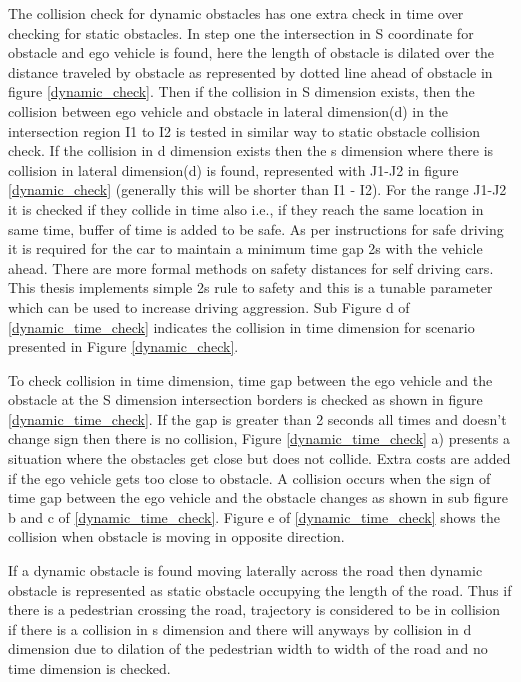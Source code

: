 The collision check for dynamic obstacles has one extra check in time over checking for static obstacles. In step one the intersection in S coordinate for obstacle and ego vehicle is found, here the length of obstacle is dilated over the distance traveled by obstacle as represented by dotted line ahead of obstacle in figure \ref{dynamic_check}. Then if the collision in S dimension exists, then the collision between ego vehicle and obstacle in lateral dimension(d) in the intersection region I1 to I2 is tested in similar way to static obstacle collision check. If the collision in d dimension exists then the s dimension where there is collision in lateral dimension(d) is found, represented with J1-J2 in figure \ref{dynamic_check} (generally this will be shorter than I1 - I2). For the range J1-J2 it is checked if they collide in time also i.e., if they reach the same location in same time, buffer of time is added to be safe. As per instructions for safe driving it is required for the car to maintain a minimum time gap 2s with the vehicle ahead. There are more formal methods \cite{mobile_eye_safety_distance} on safety distances for self driving cars. This thesis implements simple 2s rule to safety and this is a tunable parameter which can be used to increase driving aggression. Sub Figure d of \ref{dynamic_time_check} indicates the collision in time dimension for scenario presented in Figure \ref{dynamic_check}.

To check collision in time dimension, time gap between the ego vehicle and the obstacle at the S dimension intersection borders is checked as shown in figure \ref{dynamic_time_check}. If the gap is greater than 2 seconds all times and doesn't change sign then there is no collision, Figure \ref{dynamic_time_check} a) presents a situation where the obstacles get close but does not collide. Extra costs are added if the ego vehicle gets too close to obstacle. A collision occurs when the sign of time gap between the ego vehicle and the obstacle changes as shown in sub figure b and c of \ref{dynamic_time_check}. Figure e of \ref{dynamic_time_check} shows the collision when obstacle is moving in opposite direction. 

If a dynamic obstacle is found moving laterally across the road then dynamic obstacle is represented as static obstacle occupying the length of the road. Thus if there is a pedestrian crossing the road, trajectory is considered to be in collision if there is a collision in s dimension and there will anyways by collision in d dimension due to dilation of the pedestrian width to width of the road and no time dimension is checked.


